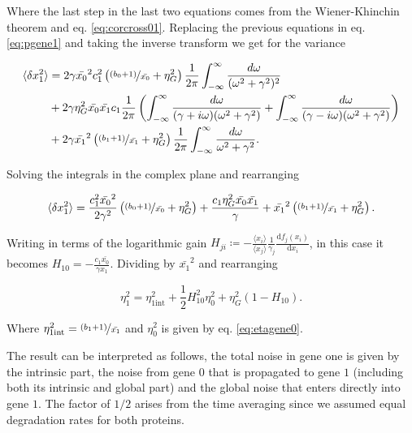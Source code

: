 Where the last step in the last two equations comes from the Wiener-Khinchin theorem and eq. \eqref{eq:corcross01}. Replacing the previous equations in eq. \eqref{eq:pgene1} and taking the inverse transform we get for the variance

\begin{equation}
  \begin{split}
    \langle \delta x_1^2\rangle &= 2\gamma\bar{x_0}^2c_1^2\left(\nicefrac{(b_0+1)}{\bar{x_0}}+ \eta_G^2\right)\frac{1}{2\pi}\int_{-\infty}^{\infty}\frac{d\omega}{(\omega^2+\gamma^2)^2}\\
    &+2\gamma\eta_G^2\bar{x_0}\bar{x_1}c_1\frac{1}{2\pi}\left(\int_{-\infty}^{\infty}\frac{d\omega}{(\gamma + i\omega)(\omega^2+\gamma^2)} + \int_{-\infty}^{\infty}\frac{d\omega}{(\gamma - i\omega)(\omega^2+\gamma^2)}\right)\\
    &+2\gamma\bar{x_1}^2 \left(\nicefrac{(b_1+1)}{\bar{x_1}}+\eta_G^2\right)\frac{1}{2\pi}\int_{-\infty}^{\infty}\frac{d\omega}{\omega^2+\gamma^2}.
  \end{split}
\end{equation} 

Solving the integrals in the complex plane and rearranging

\begin{equation}
  \langle \delta x_1^2\rangle = \frac{c_1^2\bar{x_0}^2}{2\gamma^2}\left(\nicefrac{(b_0+1)}{\bar{x_0}}+ \eta_G^2\right) + \frac{c_1\eta_G^2\bar{x_0}\bar{x_1}}{\gamma} + \bar{x_1}^2\left(\nicefrac{(b_1+1)}{\bar{x_1}}+\eta_G^2\right).
\end{equation}

Writing in terms of the logarithmic gain $H_{ji}\coloneqq -\frac{\langle x_i\rangle}{\langle x_j\rangle}\frac{1}{\gamma_j}\frac{\mathrm{d} f_j(x_i)}{\mathrm{d}x_i}$, in this case it becomes $H_{10}=-\frac{c_1\bar{x_0}}{\gamma x_1}$. Dividing by $\bar{x_1}^2$ and rearranging

\begin{equation}
  \label{eq:etagene1}
  \boxed{\eta_1^2 = \eta_{1\text{int}}^2 + \frac{1}{2}H_{10}^2\eta_0^2+\eta_G^2\left(1-H_{10}\right)}.
\end{equation}


Where $\eta_{1\text{int}}^2 = \nicefrac{(b_1+1)}{\bar{x_1}}$ and $\eta_0^2$ is given by eq. \ref{eq:etagene0}.

The result can be interpreted as follows, the total noise in gene one is given by the intrinsic part, the noise from gene $0$ that is propagated to gene $1$ (including both its intrinsic and global part) and the global noise that enters directly into gene $1$. The factor of $1/2$ arises from the time averaging since we assumed equal degradation rates for both proteins.

